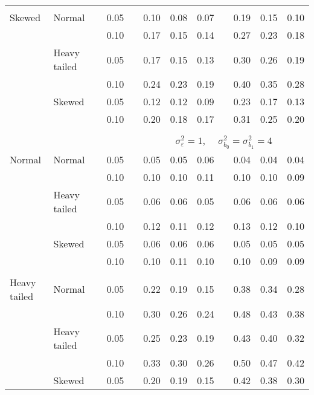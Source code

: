 \begin{table}[ht]
\begin{scriptsize}
\begin{center}
\begin{tabular}{ll p{.1cm} c p{.1cm} rrr p{.1cm} rrr}
             &&&&&&&&&&&\\
Skewed       & Normal       && 0.05 &&  0.10 & 0.08 & 0.07 && 0.19 & 0.15 & 0.10 \\ 
             &              && 0.10 &&  0.17 & 0.15 & 0.14 && 0.27 & 0.23 & 0.18 \\ 
             & Heavy tailed && 0.05 &&  0.17 & 0.15 & 0.13 && 0.30 & 0.26 & 0.19 \\ 
             &              && 0.10 &&  0.24 & 0.23 & 0.19 && 0.40 & 0.35 & 0.28 \\ 
             & Skewed       && 0.05 &&  0.12 & 0.12 & 0.09 && 0.23 & 0.17 & 0.13 \\ 
             &              && 0.10 &&  0.20 & 0.18 & 0.17 && 0.31 & 0.25 & 0.20 \\ 


&&&&&&&&&&&\\
& && && \multicolumn{7}{c}{$\sigma_{\varepsilon}^2 = 1$, \ \ $\sigma_{b_0}^2 = \sigma_{b_1}^2 = 4$} \\ \cline{6-12}
\rowcolor{gray!20}Normal       & Normal       && 0.05 &&  0.05 & 0.05 & 0.06 && 0.04 & 0.04 & 0.04 \\ 
\rowcolor{gray!20}             &              && 0.10 &&  0.10 & 0.10 & 0.11 && 0.10 & 0.10 & 0.09 \\ 
\rowcolor{gray!20}             & Heavy tailed && 0.05 &&  0.06 & 0.06 & 0.05 && 0.06 & 0.06 & 0.06 \\ 
\rowcolor{gray!20}             &              && 0.10 &&  0.12 & 0.11 & 0.12 && 0.13 & 0.12 & 0.10 \\ 
\rowcolor{gray!20}             & Skewed       && 0.05 &&  0.06 & 0.06 & 0.06 && 0.05 & 0.05 & 0.05 \\ 
\rowcolor{gray!20}             &              && 0.10 &&  0.10 & 0.11 & 0.10 && 0.10 & 0.09 & 0.09 \\ 
 &&&&&&&&&&&\\
Heavy tailed & Normal       && 0.05 &&  0.22 & 0.19 & 0.15 && 0.38 & 0.34 & 0.28 \\ 
             &              && 0.10 &&  0.30 & 0.26 & 0.24 && 0.48 & 0.43 & 0.38 \\ 
             & Heavy tailed && 0.05 &&  0.25 & 0.23 & 0.19 && 0.43 & 0.40 & 0.32 \\ 
             &              && 0.10 &&  0.33 & 0.30 & 0.26 && 0.50 & 0.47 & 0.42 \\ 
             & Skewed       && 0.05 &&  0.20 & 0.19 & 0.15 && 0.42 & 0.38 & 0.30 \\ 

\end{tabular}
\end{center}
\end{scriptsize}
\end{table}
